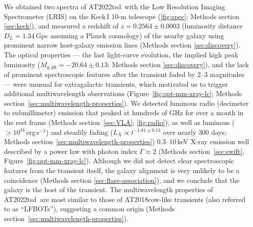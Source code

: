 \documentclass{nature_plusfigure}
\newcommand{\at}{AT2022tsd}
\begin{document}
We obtained two spectra of \at\ with the Low Resolution Imaging Spectrometer (LRIS) on the Keck\,I 10-m telescope (\ref{fig:spec}; Methods section \ref{sec:keck}), and measured\cite{Ho2022_Astronote_Keck} a redshift of $z=0.2564\pm0.0003$ (luminosity distance $D_L=1.34\,$Gpc assuming a Planck cosmology\cite{Planck2020}) of the nearby galaxy using prominent narrow host-galaxy emission lines (Methods section \ref{sec:discovery}). 
The optical properties --- the fast light-curve evolution, the implied high peak luminosity ($M_{g,\mathrm{pk}}=-20.64\pm0.13$; Methods section \ref{sec:discovery}), and the lack of prominent spectroscopic features after the transient faded by 2--3 magnitudes --- were unusual for extragalactic transients, which motivated us to trigger additional multiwavelength observations (Figure~\ref{fig:opt-mm-xray-lc}; Methods section~\ref{sec:multiwavelength-properties}).
We detected luminous radio (decimeter\cite{Ho2022Astronote_radio} to submillimeter) emission that peaked at hundreds of GHz for over a month in the rest frame (Methods section~\ref{sec:VLA}; \ref{fig:radio}),
as well as luminous ($>10^{44}\,$erg\,s$^{-1}$) and steadily fading ($L_X\propto t^{-1.81\pm0.13}$ over nearly 300 days; Methods section~\ref{sec:multiwavelength-properties}) 0.3--10\,keV X-ray emission\cite{Schulze2022Astronote_xray} well described by a power law with photon index $\Gamma\approx2$ (Methods section~\ref{sec:swift}, Figure~\ref{fig:opt-mm-xray-lc}).
Although we did not detect clear spectroscopic features from the transient itself, the galaxy alignment is very unlikely to be a coincidence (Methods section \ref{sec:flare-association}), and we conclude that the galaxy is the host of the transient.
The multiwavelength properties of \at\ are most similar to those of AT2018cow-like transients (also referred to as ``LFBOTs\cite{Metzger2022}''), suggesting a common origin (Methods section~\ref{sec:multiwavelength-properties}).
\end{document}
